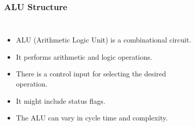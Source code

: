 \begin{frame}
    \frametitle{ALU Structure}
    \begin{columns}
        \begin{itemize}
            \item ALU (Arithmetic Logic Unit) is a combinational circuit.
            \item It performs arithmetic and logic operations.
            \item There is a control input for selecting the desired operation.
            \item It might include status flags.
            \item The ALU can vary in cycle time and complexity.
        \end{itemize}

            \newsavebox{\asciialu}
            \begin{lrbox}{\asciialu}
                \begin{varwidth}{\maxdimen}
                \end{varwidth}
            \end{lrbox}%

            \begin{figure}[h]
                \centering
                \scalebox{0.7}{\usebox{\asciialu}}
            \end{figure}
    \end{columns}
    \note{
    }
\end{frame}
